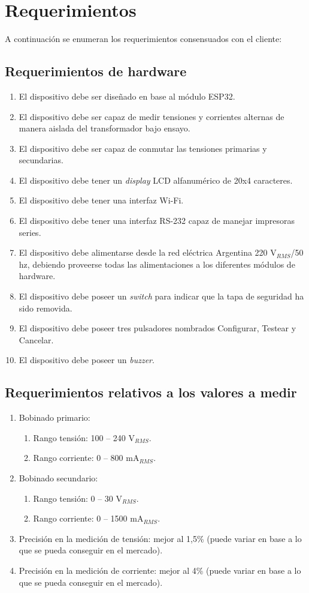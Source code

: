 \section{Requerimientos}

A continuación se enumeran los requerimientos consensuados con el cliente:

\subsection{Requerimientos de hardware}
	\begin{enumerate}
	\item El dispositivo debe ser diseñado en base al módulo ESP32.
	\item El dispositivo debe ser capaz de medir tensiones y corrientes alternas de manera aislada del transformador bajo ensayo.
	\item El dispositivo debe ser capaz de conmutar las tensiones primarias y secundarias.
	\item El dispositivo debe tener un \textit{display} LCD alfanumérico de 20x4 caracteres.
	\item El dispositivo debe tener una interfaz Wi-Fi.
	\item El dispositivo debe tener una interfaz RS-232 capaz de manejar impresoras series.
	\item El dispositivo debe alimentarse desde la red eléctrica Argentina 220 V$_{RMS}$/50 hz, debiendo proveerse todas las alimentaciones a los diferentes módulos de hardware.
	\item El dispositivo debe poseer un \textit{switch} para indicar que la tapa de seguridad ha sido removida.
	\item El dispositivo debe poseer tres pulsadores nombrados Configurar, Testear y Cancelar.
	\item El dispositivo debe poseer un \textit{buzzer}.
	\end{enumerate}
\subsection{Requerimientos relativos a los valores a medir}
	\begin{enumerate}
	\item Bobinado primario:
		\begin{enumerate}
		\item Rango tensión: 100 – 240 V$_{RMS}$.
		\item Rango corriente: 0 – 800 mA$_{RMS}$.
		\end{enumerate}
	\item Bobinado secundario:
		\begin{enumerate}
		\item Rango tensión: 0 – 30 V$_{RMS}$.
		\item Rango corriente: 0 – 1500 mA$_{RMS}$.
		\end{enumerate}
	\item Precisión en la medición de tensión: mejor al 1,5\% (puede variar en base a lo que se pueda conseguir en el mercado).
	\item Precisión en la medición de corriente: mejor al 4\% (puede variar en base a lo que se pueda conseguir en el mercado).
	\end{enumerate}
